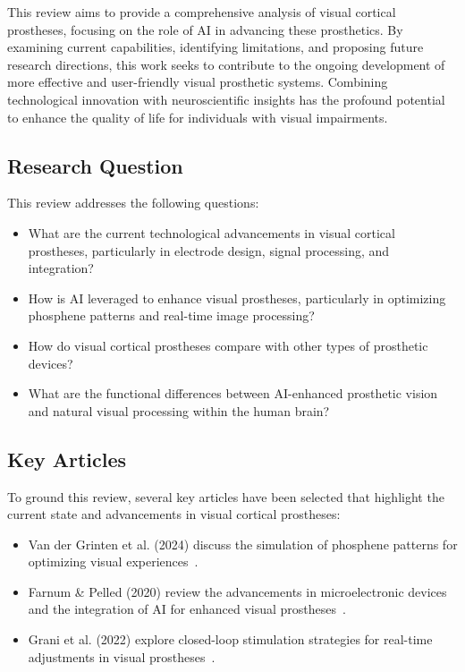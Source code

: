 \documentclass[twocolumn,10pt]{article}
\begin{document}
This review aims to provide a comprehensive analysis of visual cortical
prostheses, focusing on the role of AI in advancing these prosthetics. By
examining current capabilities, identifying limitations, and proposing future
research directions, this work seeks to contribute to the ongoing development of
more effective and user-friendly visual prosthetic systems. Combining
technological innovation with neuroscientific insights has the profound
potential to enhance the quality of life for individuals with visual
impairments.

\subsection{Research Question}
This review addresses the following questions:
\begin{itemize}
      \item What are the current technological advancements in visual cortical
            prostheses, particularly in electrode design, signal processing, and
            integration?
      \item How is AI leveraged to enhance visual prostheses, particularly in
            optimizing phosphene patterns and real-time image
            processing?
      \item How do visual cortical prostheses compare with other types of
            prosthetic devices?
      \item What are the functional differences between AI-enhanced prosthetic
            vision and natural visual processing within the human brain?
\end{itemize}

\subsection{Key Articles}\label{sec:key_articles}
To ground this review, several key articles have been selected that highlight
the current state and advancements in visual cortical prostheses:
\begin{itemize}
      \item Van der Grinten et al. (2024) discuss the simulation of phosphene
            patterns for optimizing visual
            experiences~\parencite{vandergrintenBiologicallyPlausiblePhosphene2024a}.
      \item Farnum \& Pelled (2020) review the advancements in microelectronic
            devices and the integration of AI for enhanced visual
            prostheses~\parencite{farnumNewVisionVisual2020}.
      \item Grani et al. (2022) explore closed-loop stimulation strategies for
            real-time adjustments in visual
            prostheses~\parencite{graniPersonalizedClosedloopStimulation2022}.
\end{itemize}
\end{document}
